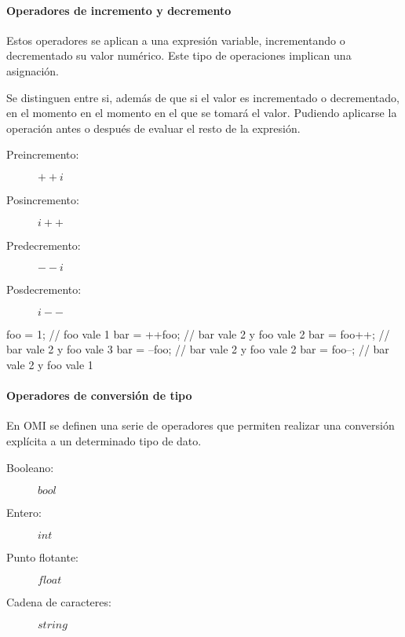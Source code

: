 \paragraph{Operadores de incremento y decremento} \label{sec:op_inc}
Estos operadores se aplican a una expresión variable, incrementando o decrementado su valor
numérico. Este tipo de operaciones implican una asignación. 

Se distinguen entre si, además de que si el valor es incrementado o decrementado, en el momento en el momento
en el que se tomará el valor. Pudiendo aplicarse la operación antes o después de evaluar el resto de la expresión.

\begin{description}
\item [Preincremento:] $++i$
\item [Posincremento:] $i++$
\item [Predecremento:] $--i$
\item [Posdecremento:] $i--$
\end{description} 


 \begin{myverbatim}
   foo = 1; // foo vale 1
   bar = ++foo; // bar vale 2 y foo vale 2
   bar = foo++; // bar vale 2 y foo vale 3
   bar = --foo; // bar vale 2 y foo vale 2
   bar = foo--; // bar vale 2 y foo vale 1
\end{myverbatim} 



\paragraph{Operadores de conversión de tipo} \label{sec:op_type}
En OMI se definen una serie de operadores que permiten realizar una conversión explícita a un determinado tipo de dato.

\begin{description}
\item [Booleano:] $bool$
\item [Entero:] $int$
\item [Punto flotante:] $float$
\item [Cadena de caracteres:] $string$
\end{description} 

